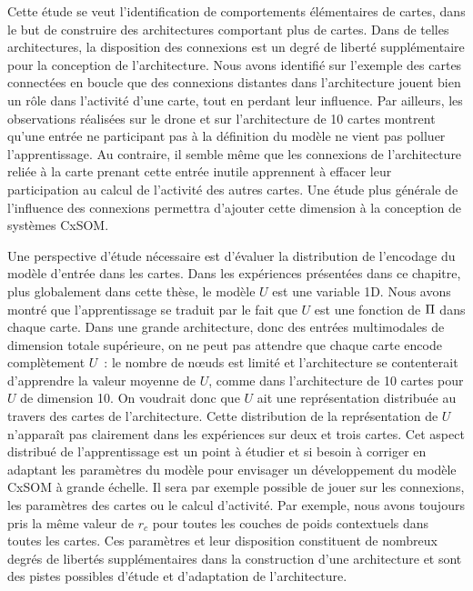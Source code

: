 \documentclass[../main]{subfiles}
\begin{document}
Cette étude se veut l'identification de comportements élémentaires de cartes, dans le but de construire des architectures comportant plus de cartes. Dans de telles architectures, la disposition des connexions est un degré de liberté supplémentaire pour la conception de l'architecture.
Nous avons identifié sur l'exemple des cartes connectées en boucle que des connexions distantes dans l'architecture jouent bien un rôle dans l'activité d'une carte, tout en perdant leur influence. Par ailleurs, les observations réalisées sur le drone et sur l'architecture de 10 cartes montrent qu'une entrée ne participant pas à la définition du modèle ne vient pas polluer l'apprentissage. Au contraire, il semble même que les connexions de l'architecture reliée à la carte prenant cette entrée inutile apprennent à effacer leur participation au calcul de l'activité des autres cartes.
Une étude plus générale de l'influence des connexions permettra d'ajouter cette dimension à la conception de systèmes CxSOM.

Une perspective d'étude nécessaire est d'évaluer la distribution de l'encodage du modèle d'entrée dans les cartes. 
Dans les expériences présentées dans ce chapitre, plus globalement dans cette thèse, le modèle $U$ est une variable 1D. 
Nous avons montré que l'apprentissage se traduit par le fait que $U$ est une fonction de $\Pi$ dans chaque carte.
Dans une grande architecture, donc des entrées multimodales de dimension totale supérieure, on ne peut pas attendre que chaque carte encode complètement $U$~: le nombre de n\oe{}uds est limité et l'architecture se contenterait d'apprendre la valeur moyenne de $U$, comme dans l'architecture de 10 cartes pour $U$ de dimension 10.
On voudrait donc que $U$ ait une représentation distribuée au travers des cartes de l'architecture. 
Cette distribution de la représentation de $U$ n'apparaît pas clairement dans les expériences sur deux et trois cartes.
Cet aspect distribué de l'apprentissage est un point à étudier et si besoin à corriger en adaptant les paramètres du modèle pour envisager un développement du modèle CxSOM à grande échelle. Il sera par exemple possible de jouer sur les connexions, les paramètres des cartes ou le calcul d'activité.
Par exemple, nous avons toujours pris la  même valeur de $r_c$ pour toutes les couches de poids contextuels dans toutes les cartes. Ces paramètres et leur disposition constituent de nombreux degrés de libertés supplémentaires dans la construction d'une architecture et sont des pistes possibles d'étude et d'adaptation de l'architecture.
\end{document}
